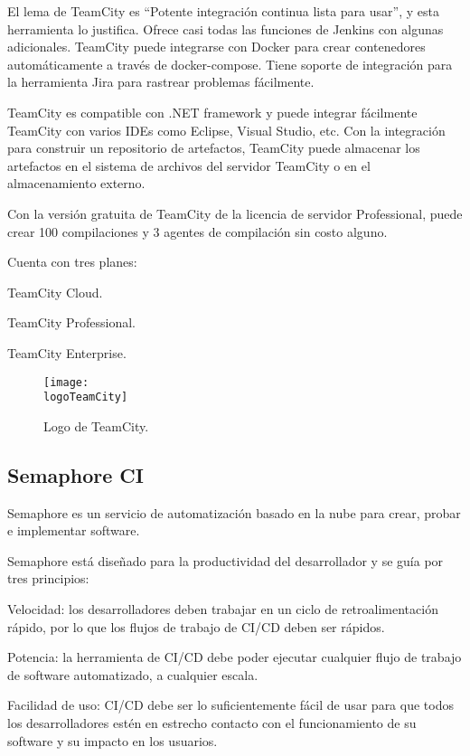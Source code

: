 El lema de TeamCity es “Potente integración continua lista para usar”, y esta herramienta lo justifica. Ofrece casi todas las funciones de Jenkins con algunas adicionales. TeamCity puede integrarse con Docker para crear contenedores automáticamente a través de docker-compose. Tiene soporte de integración para la herramienta Jira para rastrear problemas fácilmente.

TeamCity es compatible con .NET framework y puede integrar fácilmente TeamCity con varios IDEs como Eclipse, Visual Studio, etc. Con la integración para construir un repositorio de artefactos, TeamCity puede almacenar los artefactos en el sistema de archivos del servidor TeamCity o en el almacenamiento externo.

Con la versión gratuita de TeamCity de la licencia de servidor Professional, puede crear 100 compilaciones y 3 agentes de compilación sin costo alguno.

Cuenta con tres planes:
\begin{compactitem}
    \item TeamCity Cloud.
    \item TeamCity Professional.
    \item TeamCity Enterprise.
\end{compactitem}

\begin{figure}[h]
    \centering
    \texttt{[image: \\logoTeamCity]}
    \caption{Logo de TeamCity.}
\end{figure}

\subsection{Semaphore CI}
Semaphore es un servicio de automatización basado en la nube para crear, probar e implementar software.

Semaphore está diseñado para la productividad del desarrollador y se guía por tres principios:
\begin{compactitem}
    \item Velocidad: los desarrolladores deben trabajar en un ciclo de retroalimentación rápido, por lo que los flujos de trabajo de CI/CD deben ser rápidos.
    \item Potencia: la herramienta de CI/CD debe poder ejecutar cualquier flujo de trabajo de software automatizado, a cualquier escala.
    \item Facilidad de uso: CI/CD debe ser lo suficientemente fácil de usar para que todos los desarrolladores estén en estrecho contacto con el funcionamiento de su software y su impacto en los usuarios.
\end{compactitem}

